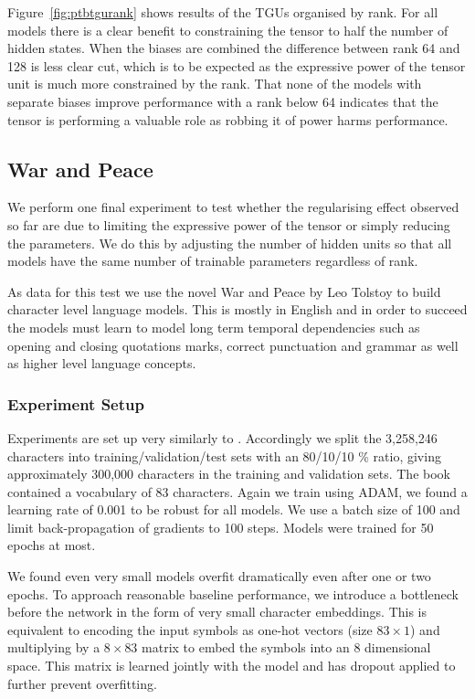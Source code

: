 Figure~\ref{fig:ptbtgurank} shows results of the TGUs organised by rank. For all models there
is a clear benefit to constraining the tensor to half the number of hidden states. When the biases
are combined the difference between rank 64 and 128 is less clear cut, which is to be expected as
the expressive power of the tensor unit is much more constrained by the rank. That none of the models
with separate biases improve performance with a rank below 64 indicates that the tensor is performing
a valuable role as robbing it of power harms performance.


\subsection{War and Peace}
We perform one final experiment to test whether the regularising effect
observed so far are due to limiting the expressive power of the tensor
or simply reducing the parameters. We do this by adjusting the number of hidden units so that
all models have the same number of trainable parameters regardless of rank.

As data for this test we use the novel War and Peace by Leo Tolstoy to build character level language
models. This is mostly in English and in order to succeed the models must learn to model long term
temporal dependencies such as opening and closing quotations marks, correct punctuation and grammar
as well as higher level language concepts.

\subsubsection{Experiment Setup}
Experiments are set up very similarly to \autocite{Karpathy2016}. Accordingly we split the 3,258,246
characters into training/validation/test sets with an 80/10/10 \% ratio, giving approximately
300,000 characters in the training and validation sets. The book contained a vocabulary of 83 characters.
Again we train using ADAM, we found a learning rate of 0.001 to be robust for all models. We use a
batch size of 100 and limit back-propagation of gradients to 100 steps. Models were trained for
50 epochs at most.

We found even very small models overfit dramatically even after one or two epochs. To approach
reasonable baseline performance, we introduce a bottleneck before the network in the form of very
small character embeddings. This is equivalent to encoding the input symbols as one-hot vectors
(size \(83 \times 1\)) and multiplying by a \(8 \times 83\) matrix to embed the symbols into an
8 dimensional space. This matrix is learned jointly with the model and has dropout 
\autocite{Srivastava2014} applied to further prevent overfitting.

